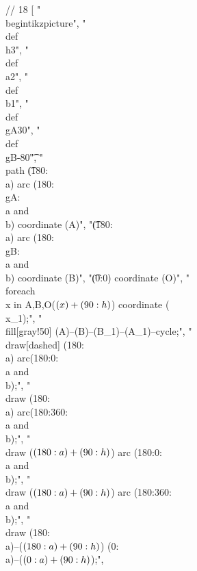 // 18
[
"\\begin{tikzpicture}",
"\t\\def\\h{3}",
"\t\\def\\a{2}",
"\t\\def\\b{1}",
"\t\\def\\gA{30}",
"\t\\def\\gB{-80}\t",
"\t\\path \t(180:\\a) arc (180:\\gA:{\\a} and {\\b}) coordinate (A)",
"\t(180:\\a) arc (180:\\gB:{\\a} and {\\b}) coordinate (B)",
"\t(0:0) coordinate (O)",
"\t\\foreach \\x in {A,B,O}{($(\\x)+(90:\\h)$) coordinate (\\x_1)};",
"\t\\fill[gray!50] (A)--(B)--(B_1)--(A_1)--cycle;",
"\t\\draw[dashed] (180:\\a) arc(180:0:{\\a} and {\\b});",
"\t\\draw (180:\\a) arc(180:360:{\\a} and {\\b});",
"\t\\draw ($(180:\\a)+(90:\\h)$) arc (180:0:{\\a} and {\\b});",
"\t\\draw ($(180:\\a)+(90:\\h)$) arc (180:360:{\\a} and {\\b});",
"\t\\draw (180:\\a)--($(180:\\a)+(90:\\h)$) (0:\\a)--($(0:\\a)+(90:\\h)$);",
